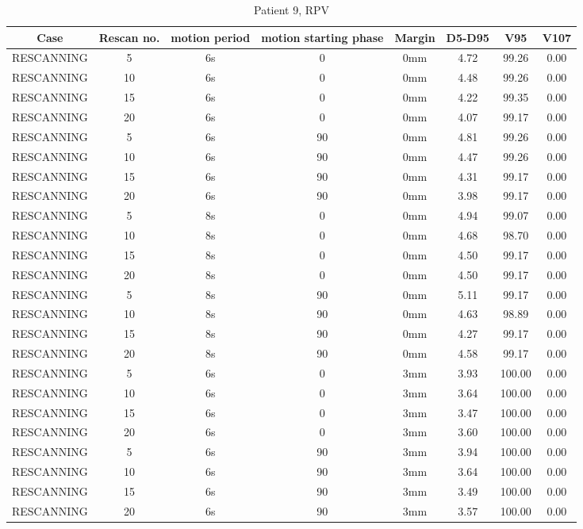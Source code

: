 \documentclass[type=dr, dr=rernat, accentcolor=tud7b,colorbacktitle, bigchapter, openright, twoside, 12pt ]{tudthesis}
\begin{document}
\begin{table}[H]
  \centering
   \scriptsize 
  \caption{Patient 9, RPV}
  \begin{tabular}{|c|c||c|c|c||c|c|c|}
    \hline\hline
    Case & Rescan no. & motion period & motion starting phase & Margin & D5-D95 & V95 & V107\\
    \hline 
RESCANNING & 5 & 6s & 0 & 0mm & 4.72 & 99.26 & 0.00 \\
RESCANNING & 10 & 6s & 0 & 0mm & 4.48 & 99.26 & 0.00 \\
RESCANNING & 15 & 6s & 0 & 0mm & 4.22 & 99.35 & 0.00 \\
RESCANNING & 20 & 6s & 0 & 0mm & 4.07 & 99.17 & 0.00 \\
RESCANNING & 5 & 6s & 90 & 0mm & 4.81 & 99.26 & 0.00 \\
RESCANNING & 10 & 6s & 90 & 0mm & 4.47 & 99.26 & 0.00 \\
RESCANNING & 15 & 6s & 90 & 0mm & 4.31 & 99.17 & 0.00 \\
RESCANNING & 20 & 6s & 90 & 0mm & 3.98 & 99.17 & 0.00 \\
RESCANNING & 5 & 8s & 0 & 0mm & 4.94 & 99.07 & 0.00 \\
RESCANNING & 10 & 8s & 0 & 0mm & 4.68 & 98.70 & 0.00 \\
RESCANNING & 15 & 8s & 0 & 0mm & 4.50 & 99.17 & 0.00 \\
RESCANNING & 20 & 8s & 0 & 0mm & 4.50 & 99.17 & 0.00 \\
RESCANNING & 5 & 8s & 90 & 0mm & 5.11 & 99.17 & 0.00 \\
RESCANNING & 10 & 8s & 90 & 0mm & 4.63 & 98.89 & 0.00 \\
RESCANNING & 15 & 8s & 90 & 0mm & 4.27 & 99.17 & 0.00 \\
RESCANNING & 20 & 8s & 90 & 0mm & 4.58 & 99.17 & 0.00 \\
RESCANNING & 5 & 6s & 0 & 3mm & 3.93 & 100.00 & 0.00 \\
RESCANNING & 10 & 6s & 0 & 3mm & 3.64 & 100.00 & 0.00 \\
RESCANNING & 15 & 6s & 0 & 3mm & 3.47 & 100.00 & 0.00 \\
RESCANNING & 20 & 6s & 0 & 3mm & 3.60 & 100.00 & 0.00 \\
RESCANNING & 5 & 6s & 90 & 3mm & 3.94 & 100.00 & 0.00 \\
RESCANNING & 10 & 6s & 90 & 3mm & 3.64 & 100.00 & 0.00 \\
RESCANNING & 15 & 6s & 90 & 3mm & 3.49 & 100.00 & 0.00 \\
RESCANNING & 20 & 6s & 90 & 3mm & 3.57 & 100.00 & 0.00 \\

\end{tabular}
\end{table}
\end{document}
